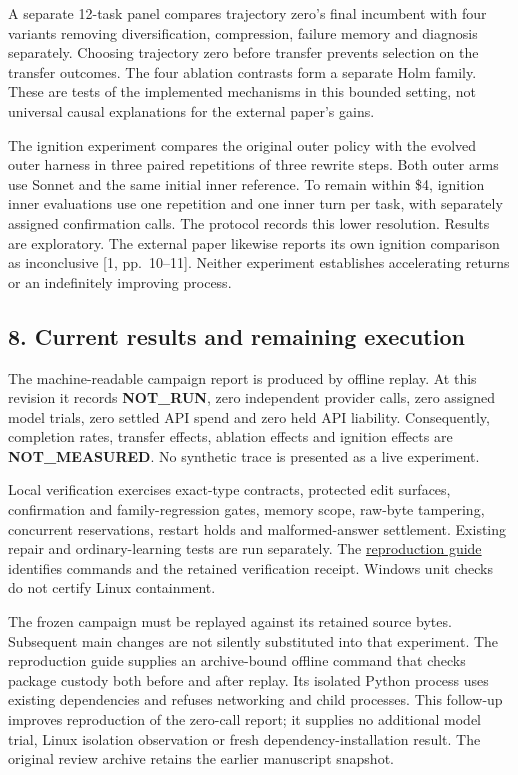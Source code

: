 \documentclass[
  11pt,
]{article}
\begin{document}
A separate 12-task panel compares trajectory zero's final incumbent with
four variants removing diversification, compression, failure memory and
diagnosis separately. Choosing trajectory zero before transfer prevents
selection on the transfer outcomes. The four ablation contrasts form a
separate Holm family. These are tests of the implemented mechanisms in
this bounded setting, not universal causal explanations for the external
paper's gains.

The ignition experiment compares the original outer policy with the
evolved outer harness in three paired repetitions of three rewrite
steps. Both outer arms use Sonnet and the same initial inner reference.
To remain within \$4, ignition inner evaluations use one repetition and
one inner turn per task, with separately assigned confirmation calls.
The protocol records this lower resolution. Results are exploratory. The
external paper likewise reports its own ignition comparison as
inconclusive {[}1, pp.~10--11{]}. Neither experiment establishes
accelerating returns or an indefinitely improving process.

\subsection{8. Current results and remaining
execution}\label{current-results-and-remaining-execution}

The machine-readable campaign report is produced by offline replay. At
this revision it records \textbf{NOT\_RUN}, zero independent provider
calls, zero assigned model trials, zero settled API spend and zero held
API liability. Consequently, completion rates, transfer effects,
ablation effects and ignition effects are \textbf{NOT\_MEASURED}. No
synthetic trace is presented as a live experiment.

Local verification exercises exact-type contracts, protected edit
surfaces, confirmation and family-regression gates, memory scope,
raw-byte tampering, concurrent reservations, restart holds and
malformed-answer settlement. Existing repair and ordinary-learning tests
are run separately. The \href{docs/reproduction.md}{reproduction guide}
identifies commands and the retained verification receipt. Windows unit
checks do not certify Linux containment.

The frozen campaign must be replayed against its retained source bytes.
Subsequent main changes are not silently substituted into that
experiment. The reproduction guide supplies an archive-bound offline
command that checks package custody both before and after replay. Its
isolated Python process uses existing dependencies and refuses
networking and child processes. This follow-up improves reproduction of
the zero-call report; it supplies no additional model trial, Linux
isolation observation or fresh dependency-installation result. The
original review archive retains the earlier manuscript snapshot.
\end{document}
